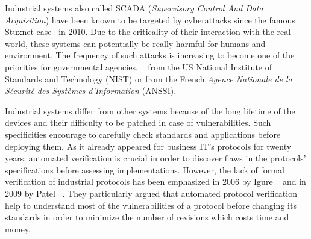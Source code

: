 Industrial systems also called SCADA (\emph{Supervisory Control And
Data Acquisition}) have been known to be targeted by cyberattacks
since the famous Stuxnet case~\cite{Lan11} in 2010.  Due to the
criticality of their interaction with the real world, these
systems can potentially be really harmful for humans and environment.
The frequency of such attacks is increasing to become one of the
priorities for governmental agencies, \eg~\cite{SFS11} from the US
National Institute of Standards and Technology (NIST) or
\cite{ANSSI12_guide_securite_industrielle_en} from the French {\em Agence
Nationale de la Sécurité des Systèmes d'Information} (ANSSI).


Industrial systems differ from other systems because of
the  long lifetime of the devices and their difficulty to
be patched in case of vulnerabilities.
Such specificities encourage to carefully check
standards and applications before deploying them.
As it already appeared for business IT's protocols for twenty years,
automated verification is crucial in order to discover flaws in the
protocols' specifications before assessing implementations. However,
the lack of formal verification of industrial protocols has been
emphasized in 2006 by Igure \etal~\cite{ILW06} and in 2009 by
Patel \emph{\etal}~\cite{PBG09}.  They particularly argued that
automated protocol verification help to understand most of the
vulnerabilities of a protocol before changing its standards in order
to minimize the number of revisions which costs time and money.


